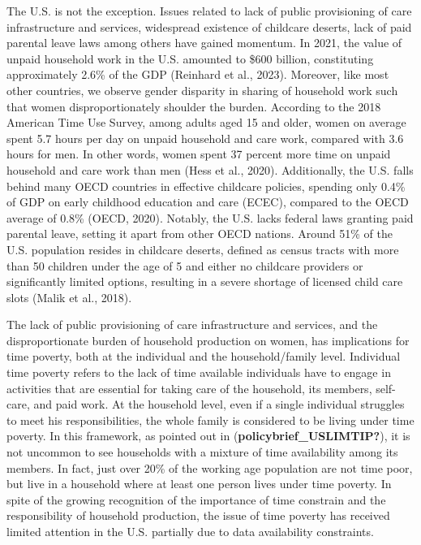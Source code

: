\documentclass[
  11pt,
]{article}
\begin{document}
The U.S. is not the exception. Issues related to lack of public
provisioning of care infrastructure and services, widespread existence
of childcare deserts, lack of paid parental leave laws among others have
gained momentum. In 2021, the value of unpaid household work in the U.S.
amounted to \$600 billion, constituting approximately 2.6\% of the GDP
(Reinhard et al., 2023). Moreover, like most other countries, we observe
gender disparity in sharing of household work such that women
disproportionately shoulder the burden. According to the 2018 American
Time Use Survey, among adults aged 15 and older, women on average spent
5.7 hours per day on unpaid household and care work, compared with 3.6
hours for men. In other words, women spent 37 percent more time on
unpaid household and care work than men (Hess et al., 2020).
Additionally, the U.S. falls behind many OECD countries in effective
childcare policies, spending only 0.4\% of GDP on early childhood
education and care (ECEC), compared to the OECD average of 0.8\% (OECD,
2020). Notably, the U.S. lacks federal laws granting paid parental
leave, setting it apart from other OECD nations. Around 51\% of the U.S.
population resides in childcare deserts, defined as census tracts with
more than 50 children under the age of 5 and either no childcare
providers or significantly limited options, resulting in a severe
shortage of licensed child care slots (Malik et al., 2018).

The lack of public provisioning of care infrastructure and services, and
the disproportionate burden of household production on women, has
implications for time poverty, both at the individual and the
household/family level. Individual time poverty refers to the lack of
time available individuals have to engage in activities that are
essential for taking care of the household, its members, self-care, and
paid work. At the household level, even if a single individual struggles
to meet his responsibilities, the whole family is considered to be
living under time poverty. In this framework, as pointed out in
(\textbf{policybrief\_USLIMTIP?}), it is not uncommon to see households
with a mixture of time availability among its members. In fact, just
over 20\% of the working age population are not time poor, but live in a
household where at least one person lives under time poverty. In spite
of the growing recognition of the importance of time constrain and the
responsibility of household production, the issue of time poverty has
received limited attention in the U.S. partially due to data
availability constraints.
\end{document}
